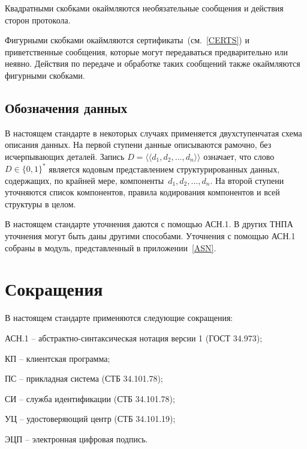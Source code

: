 Квадратными скобками окаймляются 
необязательные сообщения и действия сторон протокола.

Фигурными скобками окаймляются сертификаты~(см.~\ref{CERTS})
и приветственные сообщения,
которые могут передаваться предварительно или неявно. 
Действия по передаче и обработке таких сообщений
также окаймляются фигурными скобками.

\subsection{Обозначения данных}

В настоящем стандарте в некоторых случаях применяется двухступенчатая 
схема описания данных. На первой ступени данные описываются рамочно, без 
исчерпывающих деталей. Запись $D = \langle\langle d_1, d_2,\ldots, d_n\rangle\rangle$ 
означает, что слово $D \in\{0,1\}^*$ является кодовым представлением 
структурированных данных, содержащих, по крайней мере, 
компоненты~$d_1, d_2,\ldots, d_n$. На второй ступени  
уточняются список компонентов, правила кодирования компонентов и всей 
структуры в целом.

В настоящем стандарте уточнения даются с помощью АСН.1.
В других ТНПА уточнения могут быть даны другими способами.
Уточнения с помощью АСН.1 собраны в модуль, представленный 
в приложении~\ref{ASN}. 

\section{Сокращения}

В настоящем стандарте применяются следующие сокращения:

АСН.1 -- абстрактно-синтаксическая нотация версии 1 (ГОСТ 34.973);

КП -- клиентская программа;

ПС -- прикладная система (СТБ 34.101.78);

СИ -- служба идентификации (СТБ 34.101.78);

УЦ -- удостоверяющий центр (СТБ 34.101.19);

ЭЦП -- электронная цифровая подпись.




